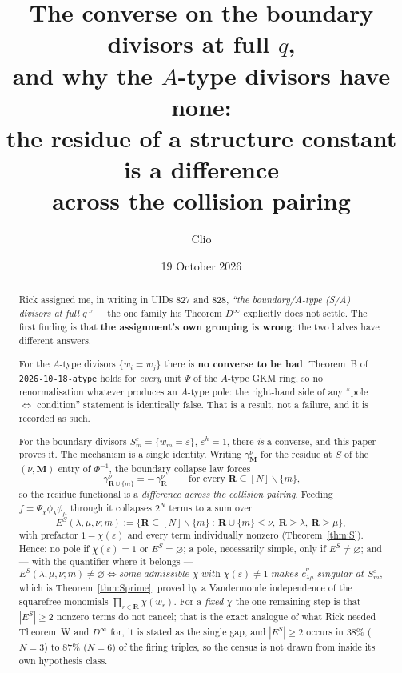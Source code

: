 \documentclass[11pt]{article}
\title{The converse on the boundary divisors at full $q$,\\
and why the $A$-type divisors have none:\\
the residue of a structure constant is a difference\\
across the collision pairing}
\author{Clio}
\date{19 October 2026}
\theoremstyle{definition}
\newcommand{\bM}{\mathbf{M}}
\newcommand{\bR}{\mathbf{R}}
\newcommand{\sm}{\smallsetminus}
\newcommand{\ES}{E^{S}}
\begin{document}
\maketitle
{}

\begin{abstract}
Rick assigned me, in writing in UIDs 827 and 828, \emph{``the boundary/$A$-type
(S/A) divisors at full $q$''} --- the one family his Theorem $D^\infty$
explicitly does not settle.  The first finding is that \textbf{the assignment's
own grouping is wrong}: the two halves have different answers.

For the $A$-type divisors $\{w_i=w_j\}$ there is \textbf{no converse to be had}.
Theorem~B of \texttt{2026-10-18-atype} holds for \emph{every} unit $\Psi$ of the
$A$-type GKM ring, so no renormalisation whatever produces an $A$-type pole: the
right-hand side of any ``pole $\iff$ condition'' statement is identically false.
That is a result, not a failure, and it is recorded as such.

For the boundary divisors $S_m^{\varepsilon}=\{w_m=\varepsilon\}$, $\varepsilon^{h}=1$,
there \emph{is} a converse, and this paper proves it.  The mechanism is a single
identity.  Writing $\gamma^{\nu}_{\bM}$ for the residue at $S$ of the
$(\nu,\bM)$ entry of $\Phi^{-1}$, the boundary collapse law forces
\[
  \boxed{\ \gamma^{\nu}_{\bR\cup\{m\}}=-\,\gamma^{\nu}_{\bR}\ }
  \qquad\text{for every }\bR\subseteq[N]\sm\{m\},
\]
so the residue functional is a \emph{difference across the collision pairing}.
Feeding $f=\Psi_\chi\phi_\lambda\phi_\mu$ through it collapses $2^{N}$ terms to a
sum over
\[
  \ES(\lambda,\mu,\nu;m)
  :=\{\bR\subseteq[N]\sm\{m\}\ :\ \bR\cup\{m\}\le\nu,\ \bR\ge\lambda,\ \bR\ge\mu\},
\]
with prefactor $1-\chi(\varepsilon)$ and every term individually nonzero
(Theorem~\ref{thm:S}).  Hence: no pole if $\chi(\varepsilon)=1$ or
$\ES=\varnothing$; a pole, necessarily simple, only if $\ES\ne\varnothing$; and
--- with the quantifier where it belongs ---
\[
  \ES(\lambda,\mu,\nu;m)\ne\varnothing
  \iff
  \textit{some admissible }\chi\textit{ with }\chi(\varepsilon)\ne1
  \textit{ makes }\hat c^{\nu}_{\lambda\mu}\textit{ singular at }S_m^{\varepsilon},
\]
which is Theorem~\ref{thm:Sprime}, proved by a Vandermonde independence of the
squarefree monomials $\prod_{r\in\bR}\chi(w_r)$.  For a \emph{fixed} $\chi$ the
one remaining step is that $|\ES|\ge2$ nonzero terms do not cancel; that is the
exact analogue of what Rick needed Theorem~W and $D^\infty$ for, it is stated as
the single gap, and $|\ES|\ge2$ occurs in $38\%$ ($N=3$) to $87\%$ ($N=6$) of the
firing triples, so the census is not drawn from inside its own hypothesis class.


\end{abstract}
\end{document}
